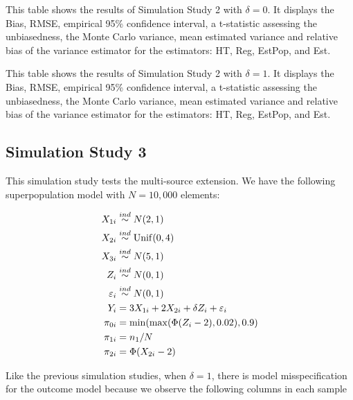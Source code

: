 \documentclass[12pt]{article}
\begin{document}
\begin{table}[ht!]
  \centering
  
\caption{This table shows the results of Simulation Study 2 with $\delta = 0$.
  It displays the Bias, RMSE, empirical 95\% confidence interval, a t-statistic
  assessing the unbiasedness, the Monte Carlo variance, mean estimated variance
  and relative bias of the variance estimator for the estimators: HT, Reg,
  EstPop, and Est.}
\label{tab:nndc0-mean}
\end{table}

\begin{table}[ht!]
  \centering
  
\caption{This table shows the results of Simulation Study 2 with $\delta = 1$.
  It displays the Bias, RMSE, empirical 95\% confidence interval, a t-statistic
  assessing the unbiasedness, the Monte Carlo variance, mean estimated variance
  and relative bias of the variance estimator for the estimators: HT, Reg,
  EstPop, and Est.}
\label{tab:nndc1-mean}
\end{table}

\subsection{Simulation Study 3}

This simulation study tests the multi-source extension.
We have the following superpopulation model with $N = 10,000$ elements:

$$
\begin{aligned}
X_{1i} &\stackrel{ind}{\sim} N(2, 1) \\
X_{2i} &\stackrel{ind}{\sim} \rm{Unif}(0, 4) \\
X_{3i} &\stackrel{ind}{\sim} N(5, 1) \\
Z_i &\stackrel{ind}{\sim} N(0, 1) \\
\varepsilon_i &\stackrel{ind}{\sim} N(0, 1) \\
Y_{i} &= 3 X_{1i} + 2 X_{2i} + \delta Z_{i} + \varepsilon_i \\
\pi_{0i} &= \min(\max(\Phi(Z_i - 2), 0.02), 0.9)\\
\pi_{1i} &= n_1 / N\\
\pi_{2i} &= \Phi(X_{2i} - 2) \\
\end{aligned}
$$

Like the previous simulation studies, when $\delta = 1$, there is model
misspecification for the outcome model because we observe the following columns
in each sample
\end{document}
